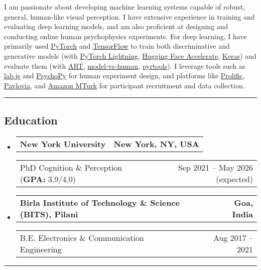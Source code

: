 \documentclass[10pt,letterpaper]{article}
\makeatletter
\newcommand{\headerrow}[2]
{\begin{tabular*}{\linewidth}{l@{\extracolsep{\fill}}r}
#1 &
#2 \\
\end{tabular*}}
\makeatother
\begin{document}
I am passionate about developing machine learning systems capable of robust, general, human-like visual perception. 
I have extensive experience in training and evaluating deep learning models, and am also proficient at designing and conducting online human psychophysics experiments. For deep learning, I have primarily used \href{https://pytorch.org/}{PyTorch} and \href{https://www.tensorflow.org/}{TensorFlow} to train both discriminative and generative models (with \href{https://lightning.ai/docs/pytorch/stable/}{PyTorch Lightning}, \href{https://huggingface.co/docs/accelerate/en/index}{Hugging Face Accelerate}, \href{https://keras.io/}{Keras}) and evaluate them (with \href{https://github.com/Trusted-AI/adversarial-robustness-toolbox}{ART}, \href{https://github.com/bethgelab/model-vs-human}{model-vs-human}, \href{https://github.com/LabForComputationalVision/pyrtools}{pyrtools}). I leverage tools such as \href{https://lab.js.org/}{lab.js} and \href{https://www.psychopy.org/}{PsychoPy} for human experiment design, and platforms like \href{https://www.prolific.com/}{Prolific}, \href{https://pavlovia.org/}{Pavlovia}, and \href{https://www.mturk.com/}{Amazon MTurk} for participant recruitment and data collection.
\vspace{1em}

\hrule
\vspace{-1em}
\subsection*{\Large Education}

\begin{itemize}[leftmargin=1em,itemsep=0.3em]
		
	\item
	      \headerrow
	      {\textbf{New York University}}
	      {\textbf{New York, NY, USA}}
	      \headerrow
	      {PhD Cognition \& Perception (\textbf{GPA:} 3.9/4.0)}
	      {Sep 2021 -- May 2026 (expected)}
		
	\item
	      \headerrow
	      {\textbf{Birla Institute of Technology \& Science (BITS), Pilani}}
	      {\textbf{Goa, India}}
	      \headerrow
	      {B.E. Electronics \& Communication Engineering}
	      {Aug 2017 -- 2021}
	      	      
\end{itemize}

\hrule
\vspace{-1em}
\end{document}
